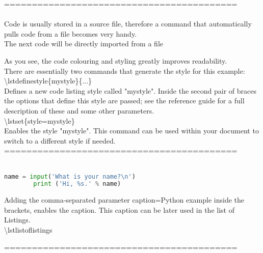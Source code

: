 \documentclass{article}
\begin{document}
	
	==========================================\\\\
	
	Code is usually stored in a source file, therefore a command that automatically pulls code from a file becomes very handy.\\
	
	The next code will be directly imported from a file
	
	
	As you see, the code colouring and styling greatly improves readability.\\
	There are essentially two commands that generate the style for this example:\\
	
	\textbackslash lstdefinestyle\{mystyle\}\{...\}\\
	Defines a new code listing style called "mystyle". Inside the second pair of braces the options that define this style are passed; see the reference guide for a full description of these and some other parameters.\\
	\textbackslash lstset\{style=mystyle\}\\
	Enables the style "mystyle". This command can be used within your document to switch to a different style if needed.\\
	
	==========================================\\\\
	
	\begin{lstlisting}[language=Python, caption= Python Program Example]
		name = input('What is your name?\n')
		print ('Hi, %s.' % name)
	\end{lstlisting}
	
	Adding the comma-separated parameter caption=Python example inside the brackets, enables the caption. This caption can be later used in the list of Listings.\\
	
	\textbackslash lstlistoflistings\\
	\lstlistoflistings
	
	==========================================\\\\
	
\end{document}
